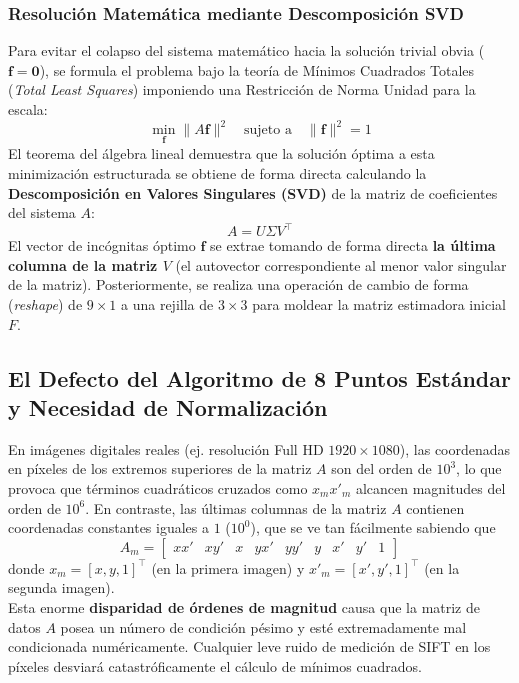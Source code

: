 \subsubsection{Resolución Matemática mediante Descomposición SVD}
\noindent
Para evitar el colapso del sistema matemático hacia la solución trivial obvia ($\mathbf{f} = \mathbf{0}$), se formula el problema bajo la teoría de Mínimos Cuadrados Totales (\textit{Total Least Squares}) imponiendo una Restricción de Norma Unidad para la escala:
\begin{equation*}
    \min_{\mathbf{f}} \|A \mathbf{f}\|^2 \quad \text{sujeto a} \quad \|\mathbf{f}\|^2 = 1 
\end{equation*}
El teorema del álgebra lineal demuestra que la solución óptima a esta minimización estructurada se obtiene de forma directa calculando la \textbf{Descomposición en Valores Singulares (SVD)} de la matriz de coeficientes del sistema $A$:
\begin{equation*}
    A = U \Sigma V^{\top} 
\end{equation*}
El vector de incógnitas óptimo $\mathbf{f}$ se extrae tomando de forma directa \textbf{la última columna de la matriz $V$} (el autovector correspondiente al menor valor singular de la matriz). Posteriormente, se realiza una operación de cambio de forma (\textit{reshape}) de $9 \times 1$ a una rejilla de $3 \times 3$ para moldear la matriz estimadora inicial $F$.

\subsection{El Defecto del Algoritmo de 8 Puntos Estándar y Necesidad de Normalización}
\noindent
En imágenes digitales reales (ej. resolución Full HD $1920 \times 1080$), las coordenadas en píxeles de los extremos superiores de la matriz $A$ son del orden de $10^3$, lo que provoca que términos cuadráticos cruzados como $x_m x'_m$ alcancen magnitudes del orden de $10^6$. En contraste, las últimas columnas de la matriz $A$ contienen coordenadas constantes iguales a $1$ ($10^0$), que se ve tan fácilmente sabiendo que 
$$A_m = \begin{bmatrix} x x' & x y' & x & y x' & y y' & y & x' & y' & 1 \end{bmatrix}$$
donde $x_m = [x, y, 1]^\top$ (en la primera imagen) y $x'_m = [x', y', 1]^\top$ (en la segunda imagen). \\

\noindent
Esta enorme \textbf{disparidad de órdenes de magnitud} causa que la matriz de datos $A$ posea un número de condición pésimo y esté extremadamente mal condicionada numéricamente. Cualquier leve ruido de medición de SIFT en los píxeles desviará catastróficamente el cálculo de mínimos cuadrados.

